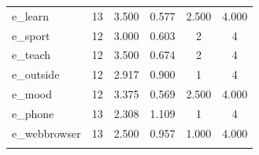\documentclass{article}
\begin{document}
\begin{table}[!htbp]
\begin{tabular}{@{\extracolsep{5pt}}lccccc}
e\_learn & 13 & 3.500 & 0.577 & 2.500 & 4.000 \\ 
e\_sport & 12 & 3.000 & 0.603 & 2 & 4 \\ 
e\_teach & 12 & 3.500 & 0.674 & 2 & 4 \\ 
e\_outside & 12 & 2.917 & 0.900 & 1 & 4 \\ 
e\_mood & 12 & 3.375 & 0.569 & 2.500 & 4.000 \\ 
e\_phone & 13 & 2.308 & 1.109 & 1 & 4 \\ 
e\_webbrowser & 13 & 2.500 & 0.957 & 1.000 & 4.000 \\ 
\hline \\[-1.8ex] 
\end{tabular} 
\end{table} 
\end{document}
